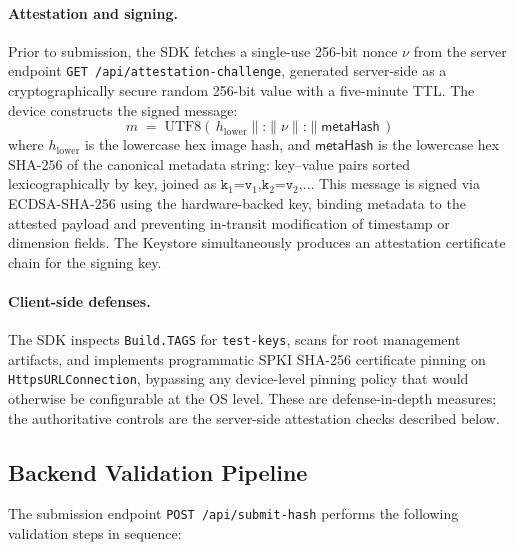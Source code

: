 \documentclass[11pt,a4paper]{article}
\newcommand{\SHA}{\text{SHA-256}}
\begin{document}
\paragraph{Attestation and signing.} Prior to submission, the SDK fetches a
single-use 256-bit nonce $\nu$ from the server endpoint
\texttt{GET /api/attestation-challenge}, generated server-side as a
cryptographically secure random 256-bit value with a five-minute TTL\@.  The
device constructs the signed message:
\[
  m \;=\; \mathrm{UTF8}\!\left(\,h_{\mathrm{lower}} \mathbin\| \texttt{:}
    \mathbin\| \nu \mathbin\| \texttt{:} \mathbin\| \mathsf{metaHash}\,\right)
\]
where $h_{\mathrm{lower}}$ is the lowercase hex image hash, and
$\mathsf{metaHash}$ is the lowercase hex $\SHA$ of the canonical metadata
string: key--value pairs sorted lexicographically by key, joined as
$\texttt{k}_1\texttt{=}\texttt{v}_1\texttt{,}\texttt{k}_2\texttt{=}\texttt{v}_2\texttt{,}\ldots$
This message is signed via ECDSA-SHA-256 using the hardware-backed key, binding
metadata to the attested payload and preventing in-transit modification of
timestamp or dimension fields.  The Keystore simultaneously produces an
attestation certificate chain for the signing key.

\paragraph{Client-side defenses.} The SDK inspects \texttt{Build.TAGS} for
\texttt{test-keys}, scans for root management artifacts, and implements
programmatic SPKI SHA-256 certificate pinning on
\texttt{HttpsURLConnection}, bypassing any device-level pinning policy
that would otherwise be configurable at the OS level.  These are defense-in-depth
measures; the authoritative controls are the server-side attestation checks
described below.

\subsection{Backend Validation Pipeline}
\label{sec:backend}

The submission endpoint \texttt{POST /api/submit-hash} performs the following
validation steps in sequence:
\end{document}
